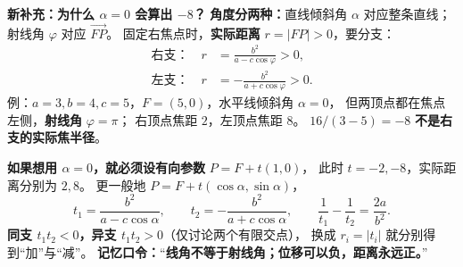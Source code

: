 \begin{summarybox}
\end{summarybox}\clearpage\begin{summarybox}

  \medskip
  \textbf{\textcolor{CSummary}{新补充：为什么 $\alpha=0$ 会算出 $-8$？}}
  \textbf{角度分两种：}直线倾斜角 $\alpha$ 对应整条直线；
  射线角 $\varphi$ 对应 $\overrightarrow{FP}$。
  固定右焦点时，\textbf{实际距离} $r=|FP|>0$，要分支：
  \[
    \boxed{\begin{aligned}
      \text{右支：}\quad r&=\frac{b^2}{a-c\cos\varphi}>0,\\[3pt]
      \text{左支：}\quad r&=-\frac{b^2}{a+c\cos\varphi}>0.
    \end{aligned}}
  \]
  例：$a=3,b=4,c=5$，$F=(5,0)$，水平线倾斜角 $\alpha=0$，
  但两顶点都在焦点左侧，\textbf{射线角} $\varphi=\pi$；
  右顶点焦距 $2$，左顶点焦距 $8$。
  $16/(3-5)=-8$ \textbf{不是右支的实际焦半径}。

  \textbf{如果想用 $\alpha=0$，就必须设有向参数} $P=F+t(1,0)$，
  此时 $t=-2,-8$，实际距离分别为 $2,8$。
  更一般地 $P=F+t(\cos\alpha,\sin\alpha)$，
  \[
    \boxed{t_1=\frac{b^2}{a-c\cos\alpha}},\qquad
    \boxed{t_2=-\frac{b^2}{a+c\cos\alpha}},
    \qquad
    \boxed{\frac1{t_1}-\frac1{t_2}=\frac{2a}{b^2}}.
  \]
  \textbf{同支 $t_1t_2<0$，异支 $t_1t_2>0$}（仅讨论两个有限交点），
  换成 $r_i=|t_i|$ 就分别得到“加”与“减”。
  \textbf{记忆口令：}“\textbf{线角不等于射线角；位移可以负，距离永远正。}”

\end{summarybox}
